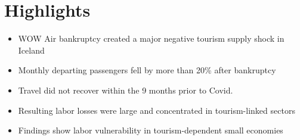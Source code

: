 \documentclass[12pt]{article}
\begin{document}
\section*{Highlights}

\begin{itemize}
    \item WOW Air bankruptcy created a major negative tourism supply shock in Iceland
    \item Monthly departing passengers fell by more than 20\% after bankruptcy
    \item Travel did not recover within the 9 months prior to Covid. 
    \item Resulting labor losses were large and concentrated in tourism-linked sectors
    \item Findings show labor vulnerability in tourism-dependent small economies
\end{itemize}
\end{document}
